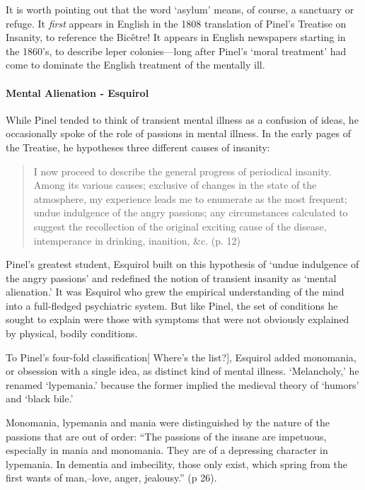It is worth pointing out that the word `asylum' means, of course, a sanctuary or refuge. It \emph{first} appears in English in the 1808 translation of Pinel's Treatise on Insanity, to reference the Bicêtre! It appears in English newspapers starting in the 1860's, to describe leper colonies---long after Pinel's `moral treatment' had come to dominate the English treatment of the mentally ill.

\paragraph{Mental Alienation - Esquirol}
\label{mentalalienation-esquirol}

While Pinel tended to think of transient mental illness as a confusion of ideas, he occasionally spoke of the role of passions in mental illness. In the early pages of the Treatise, he hypotheses three different causes of insanity:

\begin{quote}

I now proceed to describe the general progress of periodical insanity. Among its various causes; exclusive of changes in the state of the atmosphere, my experience leads me to enumerate as the most frequent; undue indulgence of the angry passions; any circumstances calculated to suggest the recollection of the original exciting cause of the disease, intemperance in drinking, inanition, \&c. (p. 12)
\end{quote}

Pinel's greatest student, Esquirol built on this hypothesis of `undue indulgence of the angry passions' and redefined the notion of transient insanity as `mental alienation.' It was Esquirol who grew the empirical understanding of the mind into a full-fledged psychiatric system. But like Pinel, the set of conditions he sought to explain were those with symptoms that were not obviously explained by physical, bodily conditions.

To Pinel's four-fold classification[ Where’s the list?], Esquirol added monomania, or obsession with a single idea, as distinct kind of mental illness. `Melancholy,' he renamed `lypemania.' because the former implied the medieval theory of `humors' and `black bile.' 

Monomania, lypemania and mania were distinguished by the nature of the passions that are out of order: “The passions of the insane are impetuous, especially in mania and monomania. They are of a depressing character in lypemania. In dementia and imbecility, those only exist, which spring from the first wants of man,--love, anger, jealousy.” (p 26). 

